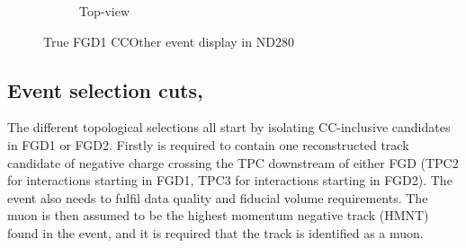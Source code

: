 \begin{figure}[htbp]
\begin{subfigure}[t]{0.49\textwidth}
		\caption{Top-view}
	\end{subfigure}
	\caption{True FGD1 CCOther event display in ND280}
	\label{fig:ccoth_evtdisplay}
\end{figure}

\subsection{Event selection cuts, \numu}
\label{sec:numu_sel}
The different topological selections all start by isolating CC-inclusive candidates in FGD1 or FGD2. Firstly is required to contain one reconstructed track candidate of negative charge crossing the TPC downstream of either FGD (TPC2 for interactions starting in FGD1, TPC3 for interactions starting in FGD2). The event also needs to fulfil data quality and fiducial volume requirements. The muon is then assumed to be the highest momentum negative track (HMNT) found in the event, and it is required that the track is identified as a muon.

